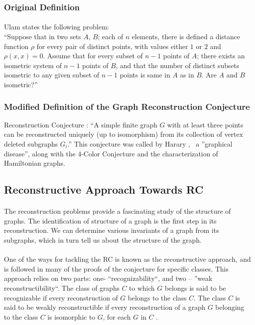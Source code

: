 \documentclass[12pt,conference]{IEEEtran}
\begin{document}
\subsubsection{ Original Definition}
\paragraph*{} Ulam \cite{u1} states the following problem:
\\
``Suppose that in two sets $A$, $B$; each of $n$ elements, there is defined a distance function $\rho$ for every pair of distinct points, with values either $1$ or $2$ and $\rho(x,x) =0$. Assume that for every subset of $n-1$ points of $A$; there exists an  isometric system of $n-1$ points of $B$, and that the number of distinct subsets isometric to any given subset of $n-1$ points  is same in $A$ as in $B$. Are $A$ and $B$ isometric?''

\subsubsection{ Modified Definition of the Graph Reconstruction Conjecture}
Reconstruction Conjecture \cite{h1}: ``A simple finite graph $G$ with at least three points can be reconstructed uniquely (up to isomorphism) from its collection of vertex deleted subgraphs $G_i$.''  This conjecture was called by Harary  \cite{h1},  a ''graphical disease'', along with the 4-Color Conjecture and the characterization of Hamiltonian graphs.

\subsection{ Reconstructive Approach Towards RC }
\paragraph*{} The reconstruction problems provide a fascinating study of the structure of graphs. The identification of structure of a graph is the first step in its reconstruction. We can determine various invariants of a graph from its subgraphs, which in turn tell us about the structure of the graph.
\paragraph*{} One of the ways for tackling the RC is known as the reconstructive approach, and is followed in many of the proofs of the conjecture for specific classes. This approach relies on two parts: one- ``recognizability``, and two – ''weak reconstructibility``\cite{b3}. The class of graphs $C$ to which $G$ belongs is said to be recognizable if every reconstruction of $G$ belongs to the class $C$. The class $C$ is said to be weakly reconstructible if every reconstruction of a graph $G$ belonging to the class $C$ is isomorphic to $G$, for each $G$ in $C$ \cite{b3}.
\end{document}

